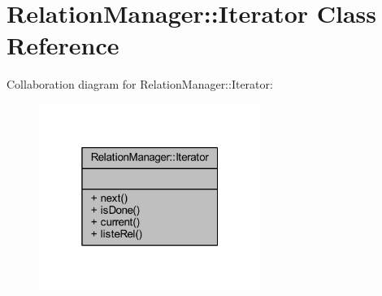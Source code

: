 \hypertarget{class_relation_manager_1_1_iterator}{}\section{Relation\+Manager\+:\+:Iterator Class Reference}
\label{class_relation_manager_1_1_iterator}


Collaboration diagram for Relation\+Manager\+:\+:Iterator\+:\nopagebreak
\begin{figure}[H]
\begin{center}
\leavevmode
\includegraphics[width=205pt]{class_relation_manager_1_1_iterator__coll__graph}
\end{center}
\end{figure}
